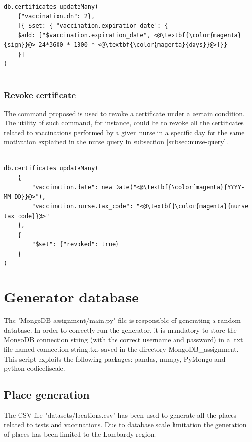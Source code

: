 \documentclass{article}
\begin{document}
\begin{lstlisting}[language=cypher, label=lst:cypher-example]

db.certificates.updateMany(
    {"vaccination.dn": 2},
    [{ $set: { "vaccination.expiration_date": {
    $add: ["$vaccination.expiration_date", <@\textbf{\color{magenta}{sign}}@> 24*3600 * 1000 * <@\textbf{\color{magenta}{days}}@>]}}
    }]
)


\end{lstlisting}
\subsubsection{Revoke certificate}
The command proposed is used to revoke a certificate under a certain condition.
The utility of such command, for instance, could be to revoke all the certificates related to vaccinations performed by a given nurse in a specific day for the same motivation
explained in the nurse query in subsection \ref{subsec:nurse-query}.

\begin{lstlisting}[language=cypher, label=lst:cypher-example]

db.certificates.updateMany(
    {
        "vaccination.date": new Date("<@\textbf{\color{magenta}{YYYY-MM-DD}}@>"),
        "vaccination.nurse.tax_code": "<@\textbf{\color{magenta}{nurse tax code}}@>"
    },
    {
        "$set": {"revoked": true}
    }
)

\end{lstlisting}
\newpage
\section{Generator database}
The {\selectfont"MongoDB-assignment/main.py"} file is responsible of generating a random database.
In order to correctly run the generator, it is mandatory to store the MongoDB connection string (with the correct username and password) in a .txt file named {\selectfont connection-string.txt} saved in the directory {\selectfont MongoDB\_assignment}.
\\This script exploits the following packages: {\selectfont pandas, numpy, PyMongo and python-codicefiscale}.

\subsection{Place generation}
The CSV file {\selectfont"datasets/locations.csv"} has been used to generate all the places related to tests and vaccinations. Due to database scale limitation the generation of places has been limited to the Lombardy region.
\end{document}
